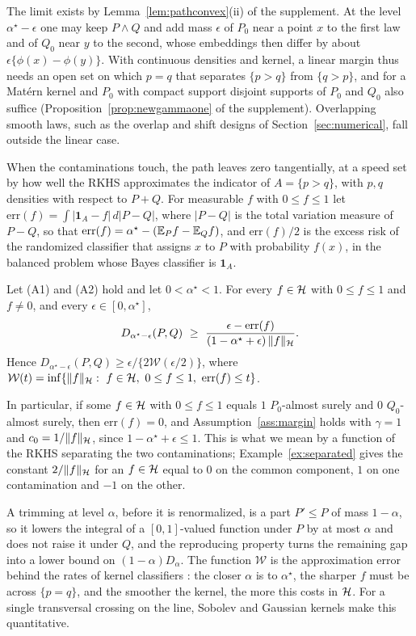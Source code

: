 The limit exists by Lemma~\ref{lem:pathconvex}(ii) of the supplement. At the level $\alpha^\star-\epsilon$ one may keep
$P\wedge Q$ and add mass $\epsilon$ of $P_0$ near a point $x$ to the first law and of $Q_0$ near $y$ to the second,
whose embeddings then differ by about $\epsilon\{\phi(x)-\phi(y)\}$. With continuous densities and kernel, a linear
margin thus needs an open set on which $p=q$ that separates $\{p>q\}$ from $\{q>p\}$, and for a Mat\'ern kernel and
$P_0$ with compact support disjoint supports of $P_0$ and $Q_0$ also suffice (Proposition~\ref{prop:newgammaone} of the
supplement). Overlapping smooth laws, such as the overlap and shift designs of Section~\ref{sec:numerical}, fall
outside the linear case.

When the contaminations touch, the path leaves zero tangentially, at a speed set by how well the RKHS approximates
the indicator of $A=\{p>q\}$, with $p,q$ densities with respect to $P+Q$. For measurable $f$ with $0\le f\le1$ let
$\mathrm{err}(f)=\int|\mathbf 1_A-f|\,d|P-Q|$, where $|P-Q|$ is the total variation measure of $P-Q$, so that
$\mathrm{err}(f)=\alpha^\star-(\mathbb{E}_Pf-\mathbb{E}_Qf)$, and $\mathrm{err}(f)/2$ is the excess risk of the randomized classifier
that assigns $x$ to $P$ with probability $f(x)$, in the balanced problem whose Bayes classifier is $\mathbf 1_A$.

\begin{proposition}
\label{prop:newapprox}
Let (A1) and (A2) hold and let $0<\alpha^\star<1$. For every $f\in\mathcal{H}$ with $0\le f\le1$ and $f\neq0$, and every
$\epsilon\in[0,\alpha^\star]$,
\[
D_{\alpha^\star-\epsilon}(P,Q)\ \ge\ \frac{\epsilon-\mathrm{err}(f)}{(1-\alpha^\star+\epsilon)\,\|f\|_\Hh} .
\]
Hence $D_{\alpha^\star-\epsilon}(P,Q)\ge\epsilon/\{2\mathcal W(\epsilon/2)\}$, where
$\mathcal W(t)=\inf\{\|f\|_\Hh:\ f\in\Hh,\ 0\le f\le1,\ \mathrm{err}(f)\le t\}$.
\end{proposition}

In particular, if some $f\in\mathcal{H}$ with $0\le f\le1$ equals $1$ $P_0$-almost surely and $0$ $Q_0$-almost surely,
then $\mathrm{err}(f)=0$, and Assumption~\ref{ass:margin} holds with $\gamma=1$ and $c_0=1/\|f\|_{\mathcal{H}}$, since
$1-\alpha^\star+\epsilon\le1$. This is what we mean by a function of the RKHS separating the two contaminations;
Example~\ref{ex:separated} gives the constant $2/\|f\|_{\mathcal{H}}$ for an $f\in\mathcal{H}$ equal to $0$ on the common component, $1$
on one contamination and $-1$ on the other.

A trimming at level $\alpha$, before it is renormalized, is a part $P'\le P$ of mass $1-\alpha$, so it lowers the
integral of a $[0,1]$-valued function under $P$ by at most $\alpha$ and does not raise it under $Q$, and the
reproducing property turns the remaining gap into a lower bound on $(1-\alpha)D_\alpha$. The function $\mathcal W$ is
the approximation error behind the rates of kernel classifiers \citep{smale2003estimating,steinwart2008svm}: the closer
$\alpha$ is to $\alpha^\star$, the sharper $f$ must be across $\{p=q\}$, and the smoother the kernel, the more this
costs in $\mathcal{H}$. For a single transversal crossing on the line, Sobolev and Gaussian kernels make this quantitative.

